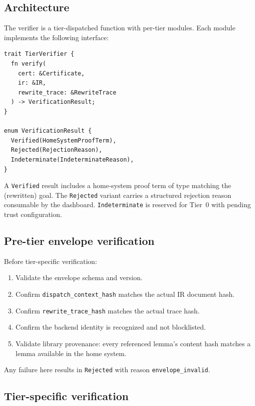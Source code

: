 \documentclass[11pt,letterpaper]{article}
\theoremstyle{definition}
\theoremstyle{remark}
\begin{document}
\subsection{Architecture}

The verifier is a tier-dispatched function with per-tier modules. Each
module implements the following interface:

\begin{lstlisting}[style=plain]
trait TierVerifier {
  fn verify(
    cert: &Certificate,
    ir: &IR,
    rewrite_trace: &RewriteTrace
  ) -> VerificationResult;
}

enum VerificationResult {
  Verified(HomeSystemProofTerm),
  Rejected(RejectionReason),
  Indeterminate(IndeterminateReason),
}
\end{lstlisting}

A \texttt{Verified} result includes a home-system proof term of type
matching the (rewritten) goal. The \texttt{Rejected} variant carries a
structured rejection reason consumable by the dashboard.
\texttt{Indeterminate} is reserved for Tier~0 with pending trust
configuration.

\subsection{Pre-tier envelope verification}

Before tier-specific verification:

\begin{enumerate}[leftmargin=2em]
  \item Validate the envelope schema and version.
  \item Confirm \texttt{dispatch\_context\_hash} matches the actual
        IR document hash.
  \item Confirm \texttt{rewrite\_trace\_hash} matches the actual
        trace hash.
  \item Confirm the backend identity is recognized and not blocklisted.
  \item Validate library provenance: every referenced lemma's content
        hash matches a lemma available in the home system.
\end{enumerate}

Any failure here results in \texttt{Rejected} with reason
\texttt{envelope\_invalid}.

\subsection{Tier-specific verification}
\end{document}
